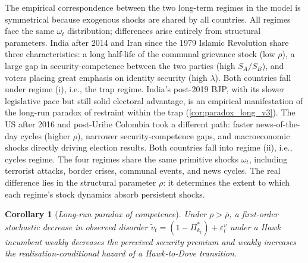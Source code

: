 \documentclass[11pt,twoside]{extarticle}
\newtheorem{corollary}{Corollary}
\begin{document}

The empirical correspondence between the two long-term regimes in the model is symmetrical because exogenous shocks are shared by all countries. All regimes face the same $\omega_t$ distribution; differences arise entirely from structural parameters.
India after 2014 and Iran since the 1979 Islamic Revolution share three characteristics: a long half-life of the communal grievance stock (low $\rho$), a large gap in security-competence between the two parties (high $S_A/S_B$), and voters placing great emphasis on identity security (high $\lambda$). Both countries fall under regime (i), i.e., the trap regime. India's post-2019 BJP, with its slower legislative pace but still solid electoral advantage, is an empirical manifestation of the long-run paradox of restraint within the trap (\autoref{cor:paradox_long_v3}).
The US after 2016 and post-Uribe Colombia took a different path: faster news-of-the-day cycles (higher $\rho$), narrower security-competence gaps, and macroeconomic shocks directly driving election results. Both countries fall into regime (ii), i.e., cycles regime.
The four regimes share the same primitive shocks $\omega_t$, including terrorist attacks, border crises, communal events, and news cycles. The real difference lies in the structural parameter $\rho$: it determines the extent to which each regime's stock dynamics absorb persistent shocks.

\begin{corollary}[\emph{Long-run paradox of competence}]\label{cor:paradox_long_v3}
Under $\rho>\bar\rho$, a first-order stochastic decrease in observed disorder $\tilde v_t=(1-\Pi_{k_t}^*)+\varepsilon_t^v$ under a Hawk incumbent weakly decreases the perceived security premium and weakly increases the realisation-conditional hazard of a Hawk-to-Dove transition.
\end{corollary}
\end{document}
